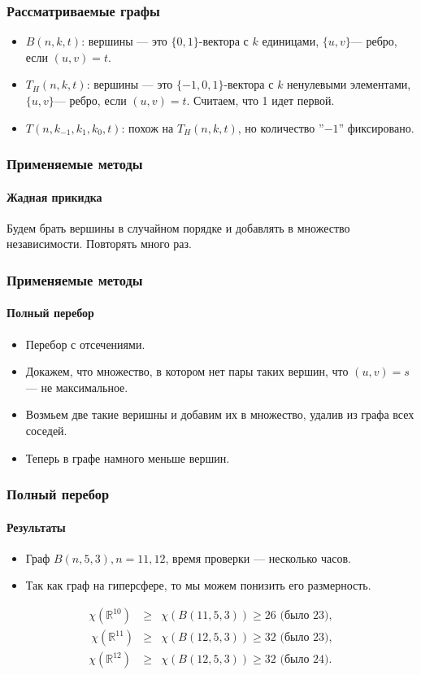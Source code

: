 \documentclass[svgnames,table]{beamer}
\newcommand\GTH{T_H(n,k,t)}
\newcommand\GB{B(n,k,t)}
\newcommand\GT{T(n,k_{-1},k_1,k_0,t)}
\begin{document}
\begin{frame}
    \frametitle{Рассматриваемые графы}
    \begin{itemize}
        \item $\GB$: вершины --- это $\{0,1\}$-вектора с $k$ единицами,
            $\{u,v\}$--- ребро, если $(u,v)=t$.
        \item $\GTH$: вершины --- это $\{-1,0,1\}$-вектора с $k$ ненулевыми
            элементами, $\{u,v\}$--- ребро, если $(u,v)=t$. Считаем, что 1
            идет первой.
        \item $\GT$: похож на $\GTH$, но количество ''$-1$'' фиксировано.
    \end{itemize}
\end{frame}

\begin{frame}
    \frametitle{Применяемые методы}
    \framesubtitle{Жадная прикидка}
        Будем брать вершины в случайном порядке и добавлять в множество
            независимости. Повторять много раз.
            
\end{frame}

\begin{frame}
    \frametitle{Применяемые методы}
    \framesubtitle{Полный перебор}
        \begin{itemize}
            \item Перебор с отсечениями.
            \item Докажем, что множество, в котором нет пары таких вершин,
                что $(u,v)=s$ --- не максимальное.
            \item Возмьем две такие веришны и добавим их в множество,
                удалив из графа всех соседей.
            \item Теперь в графе намного меньше вершин.
        \end{itemize}
\end{frame}

\begin{frame}
    \frametitle{Полный перебор}
    \framesubtitle{Результаты}
        \begin{itemize}
            \item Граф $B(n,5,3), n=11,12$, время проверки --- несколько часов.
            \item Так как граф на гиперсфере, то мы можем понизить его размерность.
        \end{itemize}
    \begin{eqnarray}
        \chi(\mathbb R^{10}) &\geq& \chi(B(11,5,3)) \geq  26 \textrm{ (было 23)},\\\
        \chi(\mathbb R^{11}) &\geq& \chi(B(12,5,3)) \geq  32 \textrm{ (было 23)},\\
        \chi(\mathbb R^{12}) &\geq& \chi(B(12,5,3)) \geq  32 \textrm{ (было 24)}.
    \end{eqnarray}
\end{frame}
\end{document}
